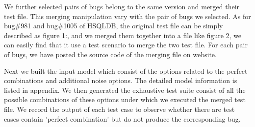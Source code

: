 \documentclass{sig-alternate}
\begin{document}
We further selected pairs of bugs belong to the same version and merged their test file. This merging manipulation vary with the pair of bugs we selected. As for bug\#981 and  bug\#1005 of HSQLDB, the original test file can be simply described as figure 1:, and we merged them together into a file like figure 2, we can easily find that it use a test scenario to merge the two test file. For each pair of bugs, we have posted the source code of the merging file on website.


Next we built the input model which consist of the options related to the perfect combinations and additional noise options. The detailed model information is listed in appendix. We then generated the exhaustive test suite consist of all the possible combinations of these options under which we executed the merged test file. We record the output of each test case to observe whether there are test cases contain 'perfect combination' but do not produce the corresponding bug.
\end{document}
